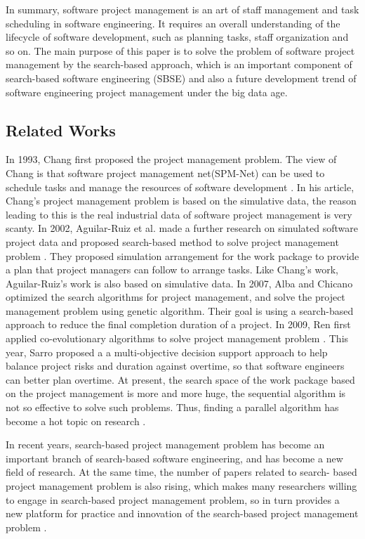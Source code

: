 In summary, software project management is an art of staff management and task
scheduling in software engineering. It requires an overall understanding of the
lifecycle of software development, such as planning tasks, staff organization
and so on. The main purpose of this paper is to solve the problem of software
project management by the search-based approach, which is an important component
of search-based software engineering (SBSE) and also a future development
trend of software engineering project management under the big data age.


\subsection{Related Works}
%
In 1993, Chang first proposed the project management problem. The view of 
Chang is that software project management net(SPM-Net) can be used to 
schedule tasks and manage the resources of software development \cite{chang}. 
In his article, Chang's project management problem is based on the simulative 
data, the reason leading to this is the real industrial data of software 
project management is very scanty. In 2002, Aguilar-Ruiz et al. made a 
further research on simulated software project data and proposed search-based 
method to solve project management problem \cite{alba}. They proposed 
simulation arrangement for the work package to provide a plan that project 
managers can follow to arrange tasks. Like Chang’s work, Aguilar-Ruiz's work 
is also based on simulative data. In 2007, Alba and Chicano optimized the 
search algorithms for project management, and solve the project management 
problem using genetic algorithm. Their goal is using a search-based approach 
to reduce the final completion duration of a project. In 2009, Ren first 
applied co-evolutionary algorithms to solve project management problem 
\cite{ren}. This year, Sarro proposed a a multi-objective decision support approach to help
balance project risks and duration against overtime, so that software
engineers can better plan overtime. \cite{sarro}
At present, the search space of the work package based on the project 
management is more and more huge, the sequential algorithm is not so 
effective to solve such problems. Thus, finding a parallel algorithm has 
become a hot topic on research \cite{pentico}.


In recent years, search-based project management problem has become an 
important branch of search-based software engineering, and has become a new 
field of research. At the same time, the number of papers related to search-
based project management problem is also rising, which makes many researchers 
willing to engage in search-based project management problem, so in turn 
provides a new platform for practice and innovation of the search-based 
project management problem \cite{penta}.


